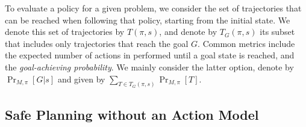 \documentclass[letterpaper]{article} %
\newcommand{\goal}{\textit{goal}}
\begin{document}





To evaluate a policy for a given problem, we consider the set of trajectories that can be reached when following that policy, starting from the initial state. We denote this set of trajectories by $T(\pi,s)$, and denote by $T_G(\pi,s)$ its subset that includes only trajectories that reach the goal $G$. 
Common metrics include the expected number of actions in performed until a goal state is reached, and the \emph{goal-achieving probability}. 
We mainly consider the latter option, denote by $\Pr_{M,\pi}[G|s]$ and given by $\sum_{T\in T_G(\pi,s)} \Pr_{M,\pi}[T]$. 

















\subsection{Safe Planning without an Action Model}
\end{document}
